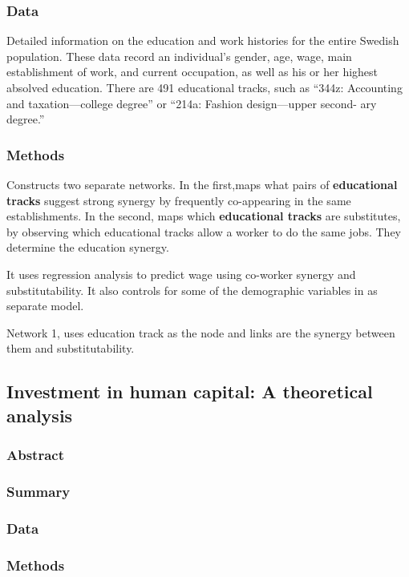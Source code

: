 \documentclass[12pt]{article}
\begin{document}
\subsubsection*{Data}
Detailed information on the education and work histories for the entire Swedish population. These data record an individual’s gender, age, wage, main establishment of work, and current occupation, as well as his or her highest absolved education.  There are 491 educational tracks, such as “344z: Accounting and taxation—college degree” or “214a: Fashion design—upper second- ary degree.”

\subsubsection*{Methods}
Constructs two separate networks. In the first,maps what pairs of \textbf{educational tracks} suggest strong synergy by frequently co-appearing in the same establishments. In the second, maps which \textbf{educational tracks} are substitutes, by observing which educational tracks allow a worker to do the same jobs. They determine the education synergy.

It uses regression analysis to predict wage using co-worker synergy and substitutability. It also controls for some of the demographic variables in as separate model.

Network 1, uses education track as the node and links are the synergy between them and substitutability. 


\subsection*{Investment in human capital: A theoretical analysis\cite{investment_human_capital}}

\subsubsection*{Abstract}

\subsubsection*{Summary}

\subsubsection*{Data}

\subsubsection*{Methods}
\end{document}
